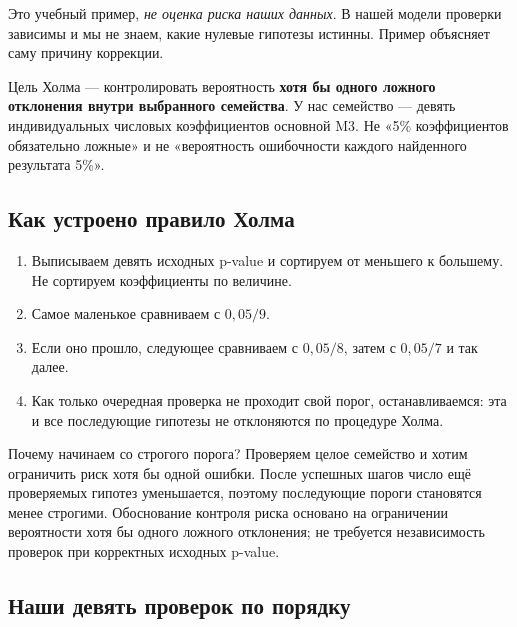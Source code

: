 \documentclass[12pt,a4paper]{article}
\begin{document}
Это учебный пример, \emph{не оценка риска наших данных}. В нашей модели проверки зависимы и мы не знаем, какие нулевые гипотезы истинны. Пример объясняет саму причину коррекции.

Цель Холма --- контролировать вероятность \textbf{хотя бы одного ложного отклонения внутри выбранного семейства}. У нас семейство --- девять индивидуальных числовых коэффициентов основной M3. Не «5\% коэффициентов обязательно ложные» и не «вероятность ошибочности каждого найденного результата 5\%».

\subsection{Как устроено правило Холма}

\begin{enumerate}
\item Выписываем девять исходных p-value и сортируем от меньшего к большему. Не сортируем коэффициенты по величине.
\item Самое маленькое сравниваем с $0{,}05/9$.
\item Если оно прошло, следующее сравниваем с $0{,}05/8$, затем с $0{,}05/7$ и так далее.
\item Как только очередная проверка не проходит свой порог, останавливаемся: эта и все последующие гипотезы не отклоняются по процедуре Холма.
\end{enumerate}

Почему начинаем со строгого порога? Проверяем целое семейство и хотим ограничить риск хотя бы одной ошибки. После успешных шагов число ещё проверяемых гипотез уменьшается, поэтому последующие пороги становятся менее строгими. Обоснование контроля риска основано на ограничении вероятности хотя бы одного ложного отклонения; не требуется независимость проверок при корректных исходных p-value.

\subsection{Наши девять проверок по порядку}
\end{document}
